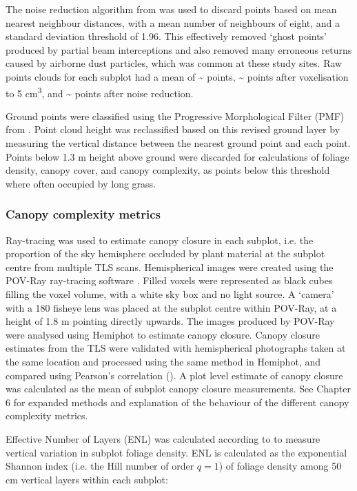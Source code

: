 \documentclass[11pt,a4paper]{article}
\begin{document}
The noise reduction algorithm from \citet{Rusu2008} was used to discard points based on mean nearest neighbour distances, with a mean number of neighbours of eight, and a standard deviation threshold of 1.96. This effectively removed `ghost points' produced by partial beam interceptions and also removed many erroneous returns caused by airborne dust particles, which was common at these study sites. Raw points clouds for each subplot had a mean of \textasciitilde{}\rawpt{} points, \textasciitilde{}\voxelpt{} points after voxelisation to 5 cm\textsuperscript{3}, and \textasciitilde{}\subpt{} points after noise reduction. 

Ground points were classified using the Progressive Morphological Filter (PMF) from \citet{Zhang2003}. Point cloud height was reclassified based on this revised ground layer by measuring the vertical distance between the nearest ground point and each point. Points below 1.3 m height above ground were discarded for calculations of foliage density, canopy cover, and canopy complexity, as points below this threshold where often occupied by long grass.

\subsubsection{Canopy complexity metrics}

Ray-tracing was used to estimate canopy closure in each subplot, i.e. the proportion of the sky hemisphere occluded by plant material at the subplot centre from multiple TLS scans. Hemispherical images were created using the POV-Ray ray-tracing software \citep{Povray2004}. Filled voxels were represented as black cubes filling the voxel volume, with a white sky box and no light source. A `camera' with a 180\textdegree{} fisheye lens was placed at the subplot centre within POV-Ray, at a height of 1.8 m pointing directly upwards. The images produced by POV-Ray were analysed using Hemiphot \citep{HemiPhot} to estimate canopy closure. Canopy closure estimates from the TLS were validated with hemispherical photographs taken at the same location and processed using the same method in Hemiphot, and compared using Pearson's correlation (\hemiCor{}). A plot level estimate of canopy closure was calculated as the mean of subplot canopy closure measurements. See Chapter 6 for expanded methods and explanation of the behaviour of the different canopy complexity metrics.

Effective Number of Layers (ENL) was calculated according to \citet{Ehbrecht2016} to measure vertical variation in subplot foliage density. ENL is calculated as the exponential Shannon index (i.e. the Hill number of order $q=1$) of foliage density among 50 cm vertical layers within each subplot:
\end{document}
